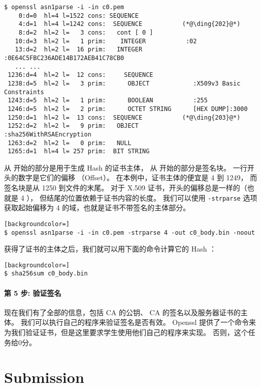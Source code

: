 \begin{lstlisting}
$ openssl asn1parse -i -in c0.pem
    0:d=0  hl=4 l=1522 cons: SEQUENCE
    4:d=1  hl=4 l=1242 cons:  SEQUENCE           (*@\ding{202}@*)
    8:d=2  hl=2 l=   3 cons:   cont [ 0 ]
   10:d=3  hl=2 l=   1 prim:    INTEGER           :02
   13:d=2  hl=2 l=  16 prim:   INTEGER           :0E64C5FBC236ADE14B172AEB41C78CB0
   ... ...
 1236:d=4  hl=2 l=  12 cons:     SEQUENCE
 1238:d=5  hl=2 l=   3 prim:      OBJECT            :X509v3 Basic Constraints
 1243:d=5  hl=2 l=   1 prim:      BOOLEAN           :255
 1246:d=5  hl=2 l=   2 prim:      OCTET STRING      [HEX DUMP]:3000
 1250:d=1  hl=2 l=  13 cons:  SEQUENCE           (*@\ding{203}@*)
 1252:d=2  hl=2 l=   9 prim:   OBJECT            :sha256WithRSAEncryption
 1263:d=2  hl=2 l=   0 prim:   NULL
 1265:d=1  hl=4 l= 257 prim:  BIT STRING
\end{lstlisting}


从  开始的部分是用于生成 Hash 的证书主体，
从  开始的部分是签名块。
一行开头的数字是它们的偏移 （Offset）。
在本例中，证书主体的便宜是 4 到 1249，
而签名块是从 1250 到文件的末尾。
对于 X.509 证书，开头的偏移总是一样的（也就是 4 ），
但结尾的位置依赖于证书内容的长度。
我们可以使用 \texttt{-strparse} 选项获取起始偏移为 4 的域，也就是证书不带签名的主体部分。

\begin{lstlisting}[backgroundcolor=]
$ openssl asn1parse -i -in c0.pem -strparse 4 -out c0_body.bin -noout
\end{lstlisting}

获得了证书的主体之后，我们就可以用下面的命令计算它的 Hash ：

\begin{lstlisting}[backgroundcolor=]
$ sha256sum c0_body.bin
\end{lstlisting}



\paragraph{第 5 步: 验证签名}
现在我们有了全部的信息，包括 CA 的公钥、 CA 的签名以及服务器证书的主体。
我们可以执行自己的程序来验证签名是否有效。
Openssl 提供了一个命令来为我们验证证书，但是这里要求学生使用他们自己的程序来实现。
否则，这个任务给0分。


\section{Submission}

\seedsubmission



